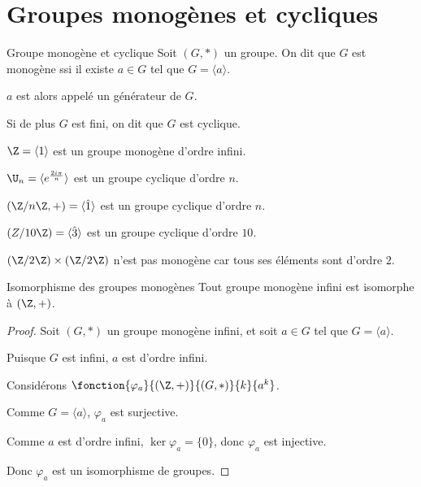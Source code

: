 \section{Groupes monogènes et cycliques }

\begin{definition}{Groupe monogène et cyclique}{}
    Soit $(G, \ast)$ un groupe. On dit que $G$ est monogène ssi il existe $a \in G$ tel que 
    $G = \langle a \rangle$. 

    $a$ est alors appelé un générateur de $G$.

    Si de plus $G$ est fini, on dit que $G$ est cyclique.
\end{definition}

\begin{exemple}
    $\Z = \langle 1 \rangle$ est un groupe monogène d'ordre infini.

    $\U_n = \langle e^{\frac{2i\pi} n} \rangle$ est un groupe cyclique d'ordre $n$.

    $(\Z/n\Z, +) = \langle \hat 1 \rangle$ est un groupe cyclique d'ordre $n$.

    $(Z / 10 \Z) = \langle \hat 3 \rangle$ est un groupe cyclique d'ordre $10$.
    
    $(\Z / 2 \Z) \times (\Z / 2 \Z)$ n'est pas monogène car tous ses éléments sont d'ordre $2$. 
\end{exemple}

\begin{theoreme}{Isomorphisme des groupes monogènes}{}
    Tout groupe monogène infini est isomorphe à $(\Z, +)$.
\end{theoreme}


\begin{proof}
    Soit $(G, \ast)$ un groupe monogène infini, et soit $a \in G$ tel que $G = \langle a \rangle$.

    Puisque $G$ est infini, $a$ est d'ordre infini.

    Considérons $\fonction{\varphi_a}{(\Z, +)}{(G, \ast)}{k}{a^k}$.

    Comme $G = \langle a \rangle$, $\varphi_a$ est surjective.

    Comme $a$ est d'ordre infini, $\ker \varphi_a = \{0\}$, donc $\varphi_a$ est injective.

    Donc $\varphi_a$ est un isomorphisme de groupes.
\end{proof}

